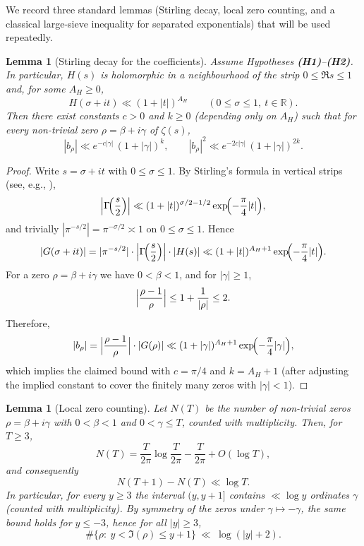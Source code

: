 \documentclass[11pt]{article}
\theoremstyle{plain}
\newtheorem{lemma}[theorem]{Lemma}
\theoremstyle{definition}
\begin{document}
\medskip
We record three standard lemmas (Stirling decay, local zero counting, and a classical large-sieve inequality for separated exponentials) that will be used repeatedly.
\medskip

\begin{lemma}[Stirling decay for the coefficients]\label{lem:decay}
Assume Hypotheses \textbf{(H1)}--\textbf{(H2)}. In particular, $H(s)$ is holomorphic in a neighbourhood of the strip $0\le \Re s\le 1$ and, for some $A_H\ge 0$,
\[
  H(\sigma+it) \ll (1+|t|)^{A_H}
  \qquad (0\le \sigma\le 1,\ t\in\mathbb{R}).
\]
Then there exist constants $c>0$ and $k\ge 0$ (depending only on $A_H$) such that for every non-trivial zero $\rho=\beta+i\gamma$ of $\zeta(s)$,
\[
  |b_\rho| \ll e^{-c|\gamma|}\,(1+|\gamma|)^k,
  \qquad
  |b_\rho|^2 \ll e^{-2c|\gamma|}\,(1+|\gamma|)^{2k}.
\]
\end{lemma}

\begin{proof}
Write $s=\sigma+it$ with $0\le \sigma\le 1$. By Stirling's formula in vertical strips (see, e.g., \cite[\S2.3]{Titchmarsh}),
\[
  \Bigl|\Gamma\!\Bigl(\frac{s}{2}\Bigr)\Bigr|
  \ll (1+|t|)^{\sigma/2-1/2}\exp\!\Bigl(-\frac{\pi}{4}|t|\Bigr),
\]
and trivially $|\pi^{-s/2}|=\pi^{-\sigma/2}\asymp 1$ on $0\le \sigma\le 1$.
Hence
\[
  |G(\sigma+it)|
  = |\pi^{-s/2}|\cdot \Bigl|\Gamma\!\Bigl(\frac{s}{2}\Bigr)\Bigr|\cdot |H(s)|
  \ll (1+|t|)^{A_H+1}\exp\!\Bigl(-\frac{\pi}{4}|t|\Bigr).
\]
For a zero $\rho=\beta+i\gamma$ we have $0<\beta<1$, and for $|\gamma|\ge 1$,
\[
  \Bigl|\frac{\rho-1}{\rho}\Bigr|
  \le 1 + \frac{1}{|\rho|}
  \le 2.
\]
Therefore,
\[
  |b_\rho|
  = \Bigl|\frac{\rho-1}{\rho}\Bigr|\cdot |G(\rho)|
  \ll (1+|\gamma|)^{A_H+1}\exp\!\Bigl(-\frac{\pi}{4}|\gamma|\Bigr),
\]
which implies the claimed bound with $c=\pi/4$ and $k=A_H+1$ (after adjusting the implied constant to cover the finitely many zeros with $|\gamma|<1$).
\end{proof}

\begin{lemma}[Local zero counting]\label{lem:localcount}
Let $N(T)$ be the number of non-trivial zeros $\rho=\beta+i\gamma$ with $0<\beta<1$ and $0<\gamma\le T$, counted with multiplicity.
Then, for $T\ge 3$,
\[
  N(T)=\frac{T}{2\pi}\log\frac{T}{2\pi}-\frac{T}{2\pi}+O(\log T),
\]
and consequently
\[
  N(T+1)-N(T)\ll \log T.
\]
In particular, for every $y\ge 3$ the interval $(y,y+1]$ contains $\ll \log y$ ordinates $\gamma$ (counted with multiplicity). By symmetry of the zeros under $\gamma\mapsto -\gamma$, the same bound holds for $y\le -3$, hence for all $|y|\ge 3$,
\[
  \#\{\rho:\ y<\Im(\rho)\le y+1\}\ \ll\ \log(|y|+2).
\]
\end{lemma}
\end{document}
